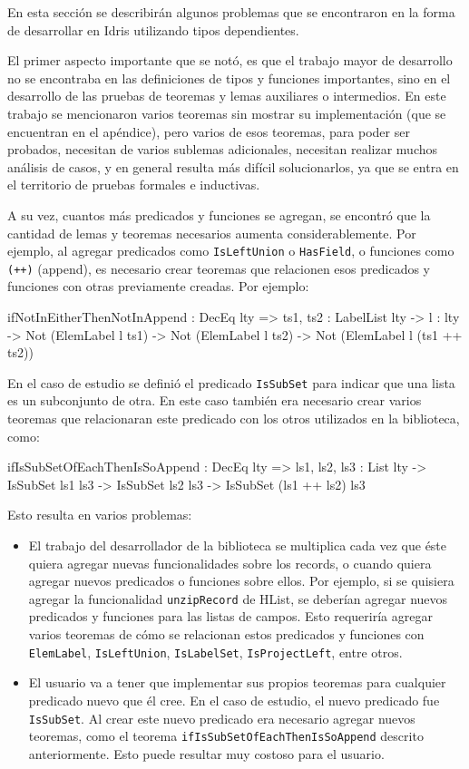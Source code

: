 En esta sección se describirán algunos problemas que se encontraron en la forma de desarrollar en Idris utilizando tipos dependientes.

El primer aspecto importante que se notó, es que el trabajo mayor de desarrollo no se encontraba en las definiciones de tipos y funciones importantes, sino en el desarrollo de las pruebas de teoremas y lemas auxiliares o intermedios. En este trabajo se mencionaron varios teoremas sin mostrar su implementación (que se encuentran en el apéndice), pero varios de esos teoremas, para poder ser probados, necesitan de varios sublemas adicionales, necesitan realizar muchos análisis de casos, y en general resulta más difícil solucionarlos, ya que se entra en el territorio de pruebas formales e inductivas.

A su vez, cuantos más predicados y funciones se agregan, se encontró que la cantidad de lemas y teoremas necesarios aumenta considerablemente. Por ejemplo, al agregar predicados como \texttt{IsLeftUnion} o \texttt{HasField}, o funciones como \texttt{(++)} (append), es necesario crear teoremas que relacionen esos predicados y funciones con otras previamente creadas. Por ejemplo:

\begin{code}
ifNotInEitherThenNotInAppend : DecEq lty =>
  {ts1, ts2 : LabelList lty} -> {l : lty} ->
  Not (ElemLabel l ts1) -> Not (ElemLabel l ts2) ->
  Not (ElemLabel l (ts1 ++ ts2))
\end{code}

En el caso de estudio se definió el predicado \texttt{IsSubSet} para indicar que una lista es un subconjunto de otra. En este caso también era necesario crear varios teoremas que relacionaran este predicado con los otros utilizados en la biblioteca, como:

\begin{code}
ifIsSubSetOfEachThenIsSoAppend : DecEq lty =>
  {ls1, ls2, ls3 : List lty} ->
  IsSubSet ls1 ls3 -> IsSubSet ls2 ls3 ->
  IsSubSet (ls1 ++ ls2) ls3
\end{code}

Esto resulta en varios problemas:

\begin{itemize}
\item El trabajo del desarrollador de la biblioteca se multiplica cada vez que éste quiera agregar nuevas funcionalidades sobre los records, o cuando quiera agregar nuevos predicados o funciones sobre ellos. Por ejemplo, si se quisiera agregar la funcionalidad \texttt{unzipRecord} de HList, se deberían agregar nuevos predicados y funciones para las listas de campos. Esto requeriría agregar varios teoremas de cómo se relacionan estos predicados y funciones con \texttt{ElemLabel}, \texttt{IsLeftUnion}, \texttt{IsLabelSet}, \texttt{IsProjectLeft}, entre otros.
\item El usuario va a tener que implementar sus propios teoremas para cualquier predicado nuevo que él cree. En el caso de estudio, el nuevo predicado fue \texttt{IsSubSet}. Al crear este nuevo predicado era necesario agregar nuevos teoremas, como el teorema \texttt{ifIsSubSetOfEachThenIsSoAppend} descrito anteriormente. Esto puede resultar muy costoso para el usuario.
\end{itemize}

